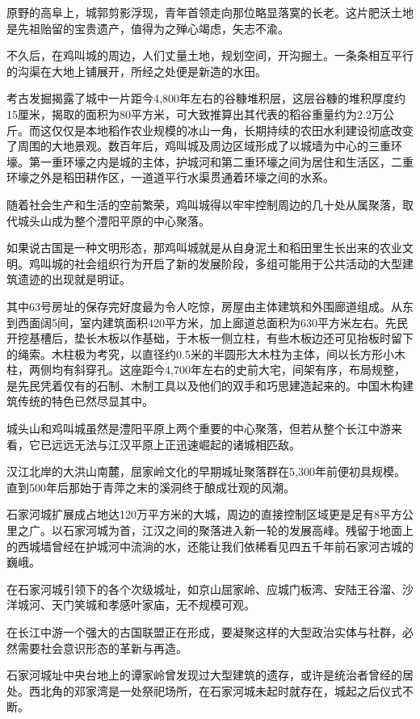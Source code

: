原野的高阜上，城郭剪影浮现，青年首领走向那位略显落寞的长老。这片肥沃土地是先祖贻留的宝贵遗产，值得为之殚心竭虑，矢志不渝。

不久后，在鸡叫城的周边，人们丈量土地，规划空间，开沟掘土。一条条相互平行的沟渠在大地上铺展开，所经之处便是新造的水田。

考古发掘揭露了城中一片距今4,800年左右的谷糠堆积层，这层谷糠的堆积厚度约15厘米，揭取的面积为80平方米，可大致推算出其代表的稻谷重量约为2.2万公斤。而这仅仅是本地稻作农业规模的冰山一角，长期持续的农田水利建设彻底改变了周围的大地景观。数百年后，鸡叫城及周边区域形成了以城墙为中心的三重环壕。第一重环壕之内是城的主体，护城河和第二重环壕之间为居住和生活区，二重环壕之外是稻田耕作区，一道道平行水渠贯通着环壕之间的水系。

随着社会生产和生活的空前繁荣，鸡叫城得以牢牢控制周边的几十处从属聚落，取代城头山成为整个澧阳平原的中心聚落。

如果说古国是一种文明形态，那鸡叫城就是从自身泥土和稻田里生长出来的农业文明。鸡叫城的社会组织行为开启了新的发展阶段，多组可能用于公共活动的大型建筑遗迹的出现就是明证。

其中63号房址的保存完好度最为令人吃惊，房屋由主体建筑和外围廊道组成。从东到西面阔5间，室内建筑面积420平方米，加上廊道总面积为630平方米左右。先民开挖基槽后，垫长木板以作基础，于木板一侧立柱，有些木板边还可见抬板时留下的绳索。木柱极为考究，以直径约0.5米的半圆形大木柱为主体，间以长方形小木柱，两侧均有斜穿孔。这座距今4,700年左右的史前大宅，间架有序，布局规整，是先民凭着仅有的石制、木制工具以及他们的双手和巧思建造起来的。中国木构建筑传统的特色已然尽显其中。

城头山和鸡叫城虽然是澧阳平原上两个重要的中心聚落，但若从整个长江中游来看，它已远远无法与江汉平原上正迅速崛起的诸城相匹敌。

汉江北岸的大洪山南麓，屈家岭文化的早期城址聚落群在5,300年前便初具规模。直到500年后那始于青萍之末的溪洞终于酿成壮观的风潮。

石家河城扩展成占地达120万平方米的大城，周边的直接控制区域更是足有8平方公里之广。以石家河城为首，江汉之间的聚落进入新一轮的发展高峰。残留于地面上的西城墙曾经在护城河中流淌的水，还能让我们依稀看见四五千年前石家河古城的巍峨。

在石家河城引领下的各个次级城址，如京山屈家岭、应城门板湾、安陆王谷溜、沙洋城河、天门笑城和孝感叶家庙，无不规模可观。

在长江中游一个强大的古国联盟正在形成，要凝聚这样的大型政治实体与社群，必然需要社会意识形态的革新与再造。

石家河城址中央台地上的谭家岭曾发现过大型建筑的遗存，或许是统治者曾经的居处。西北角的邓家湾是一处祭祀场所，在石家河城未起时就存在，城起之后仪式不断。


